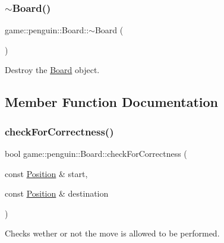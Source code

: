 \subsubsection{\texorpdfstring{$\sim$\+Board()}{~Board()}}
{\footnotesize\ttfamily game\+::penguin\+::\+Board\+::$\sim$\+Board (\begin{DoxyParamCaption}{ }\end{DoxyParamCaption})}



Destroy the \hyperlink{classgame_1_1penguin_1_1_board}{Board} object. 



\subsection{Member Function Documentation}
\mbox{\label{classgame_1_1penguin_1_1_board_a2864b1af9dbdf19273185c504257435c}} 
\subsubsection{\texorpdfstring{check\+For\+Correctness()}{checkForCorrectness()}}
{\footnotesize\ttfamily bool game\+::penguin\+::\+Board\+::check\+For\+Correctness (\begin{DoxyParamCaption}\item[{const \hyperlink{structgame_1_1_position}{Position} \&}]{start,  }\item[{const \hyperlink{structgame_1_1_position}{Position} \&}]{destination }\end{DoxyParamCaption})\hspace{0.3cm}{\ttfamily [protected]}}



Checks wether or not the move is allowed to be performed. 


